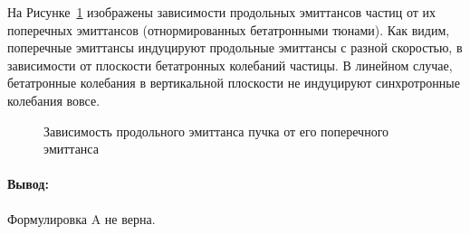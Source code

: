 На Рисунке~\ref{fig:long_emitt_vs_trans_emitt} изображены зависимости продольных эмиттансов частиц от их поперечных эмиттансов (отнормированных бетатронными тюнами). Как видим, поперечные эмиттансы индуцируют продольные эмиттансы с разной скоростью, в зависимости от плоскости бетатронных колебаний частицы. В линейном случае, бетатронные колебания в вертикальной плоскости не индуцируют синхротронные колебания вовсе.
\begin{figure}[H]
	\centering
	\caption{Зависимость продольного эмиттанса пучка от его поперечного эмиттанса\label{fig:long_emitt_vs_trans_emitt}}
\end{figure}

\paragraph{Вывод:} Формулировка A не верна. 
